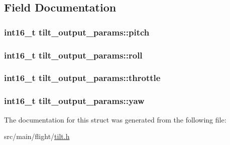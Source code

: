 \subsection{Field Documentation}
\hypertarget{structtilt__output__params_a9f22346ddba202c0a750ada5ae08cfe9}{
\subsubsection[{pitch}]{\setlength{\rightskip}{0pt plus 5cm}int16\+\_\+t tilt\+\_\+output\+\_\+params\+::pitch}}\label{structtilt__output__params_a9f22346ddba202c0a750ada5ae08cfe9}
\hypertarget{structtilt__output__params_afd4b9309f77ee689bd3af744ca7093a2}{
\subsubsection[{roll}]{\setlength{\rightskip}{0pt plus 5cm}int16\+\_\+t tilt\+\_\+output\+\_\+params\+::roll}}\label{structtilt__output__params_afd4b9309f77ee689bd3af744ca7093a2}
\hypertarget{structtilt__output__params_ae50193f0a1a8a7e45157948dcf8bedda}{
\subsubsection[{throttle}]{\setlength{\rightskip}{0pt plus 5cm}int16\+\_\+t tilt\+\_\+output\+\_\+params\+::throttle}}\label{structtilt__output__params_ae50193f0a1a8a7e45157948dcf8bedda}
\hypertarget{structtilt__output__params_a820a14a0c5a807a82d0f810ac4a85232}{
\subsubsection[{yaw}]{\setlength{\rightskip}{0pt plus 5cm}int16\+\_\+t tilt\+\_\+output\+\_\+params\+::yaw}}\label{structtilt__output__params_a820a14a0c5a807a82d0f810ac4a85232}


The documentation for this struct was generated from the following file\+:\begin{DoxyCompactItemize}
\item 
src/main/flight/\hyperlink{flight_2tilt_8h}{tilt.\+h}\end{DoxyCompactItemize}
